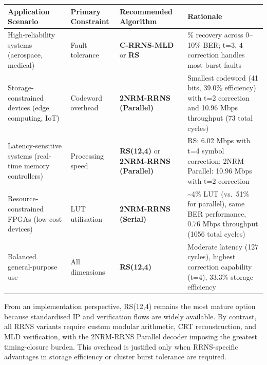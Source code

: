 \documentclass[
  12pt,
  a4paper]{report}
\newcounter{none} %
\begin{document}
{\def\LTcaptype{none} %
\begin{longtable}[]{@{}
  >{\raggedright\arraybackslash}p{}
  >{\raggedright\arraybackslash}p{}
  >{\raggedright\arraybackslash}p{}
  >{\raggedright\arraybackslash}p{}@{}}
\toprule\noalign{}
\begin{minipage}[b]{\linewidth}\raggedright
Application Scenario
\end{minipage} & \begin{minipage}[b]{\linewidth}\raggedright
Primary Constraint
\end{minipage} & \begin{minipage}[b]{\linewidth}\raggedright
Recommended Algorithm
\end{minipage} & \begin{minipage}[b]{\linewidth}\raggedright
Rationale
\end{minipage} \\
\midrule\noalign{}
\endhead
\bottomrule\noalign{}
\endlastfoot
High-reliability systems (aerospace, medical) & Fault tolerance &
\textbf{C-RRNS-MLD} or \textbf{RS} & 100\% recovery across 0--10\% BER;
t=3, 4 correction handles most burst faults \\
Storage-constrained devices (edge computing, IoT) & Codeword overhead &
\textbf{2NRM-RRNS (Parallel)} & Smallest codeword (41 bits, 39.0\%
efficiency) with t=2 correction and 10.96 Mbps throughput (73 total
cycles) \\
Latency-sensitive systems (real-time memory controllers) & Processing
speed & \textbf{RS(12,4)} or \textbf{2NRM-RRNS (Parallel)} & RS: 6.02
Mbps with t=4 symbol correction; 2NRM-Parallel: 10.96 Mbps with t=2
correction \\
Resource-constrained FPGAs (low-cost devices) & LUT utilisation &
\textbf{2NRM-RRNS (Serial)} & \textasciitilde4\% LUT (vs.~51\% for
parallel), same BER performance, 0.76 Mbps throughput (1056 total
cycles) \\
Balanced general-purpose use & All dimensions & \textbf{RS(12,4)} &
Moderate latency (127 cycles), highest correction capability (t=4),
33.3\% storage efficiency \\
\end{longtable}
}

From an implementation perspective, RS(12,4) remains the most mature
option because standardised IP and verification flows are widely
available. By contrast, all RRNS variants require custom modular
arithmetic, CRT reconstruction, and MLD verification, with the 2NRM-RRNS
Parallel decoder imposing the greatest timing-closure burden. This
overhead is justified only when RRNS-specific advantages in storage
efficiency or cluster burst tolerance are required.
\end{document}
